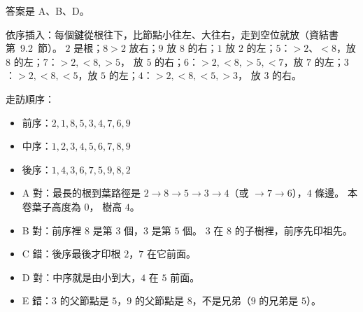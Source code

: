 \begin{pastsoln}
答案是 A、B、D。

依序插入：每個鍵從根往下，比節點小往左、大往右，走到空位就放（資結書第~9.2~節）。
$2$ 是根；$8 > 2$ 放右；$9$ 放 $8$ 的右；$1$ 放 $2$ 的左；$5$：$>2$、$<8$，放 $8$ 的左；$7$：$>2, <8, >5$，
放 $5$ 的右；$6$：$>2, <8, >5, <7$，放 $7$ 的左；$3$：$>2, <8, <5$，放 $5$ 的左；$4$：$>2, <8, <5, >3$，
放 $3$ 的右。
\begin{center}
\end{center}
走訪順序：
\begin{itemize}
\item 前序：$2, 1, 8, 5, 3, 4, 7, 6, 9$
\item 中序：$1, 2, 3, 4, 5, 6, 7, 8, 9$
\item 後序：$1, 4, 3, 6, 7, 5, 9, 8, 2$
\end{itemize}
\begin{itemize}
\item A 對：最長的根到葉路徑是 $2 \to 8 \to 5 \to 3 \to 4$（或 $\to 7 \to 6$），$4$ 條邊。 本卷葉子高度為 $0$，
樹高 $4$。
\item B 對：前序裡 $8$ 是第 $3$ 個，$3$ 是第 $5$ 個。 $3$ 在 $8$ 的子樹裡，前序先印祖先。
\item C 錯：後序最後才印根 $2$，$7$ 在它前面。
\item D 對：中序就是由小到大，$4$ 在 $5$ 前面。
\item E 錯：$3$ 的父節點是 $5$，$9$ 的父節點是 $8$，不是兄弟（$9$ 的兄弟是 $5$）。
\end{itemize}
\end{pastsoln}
